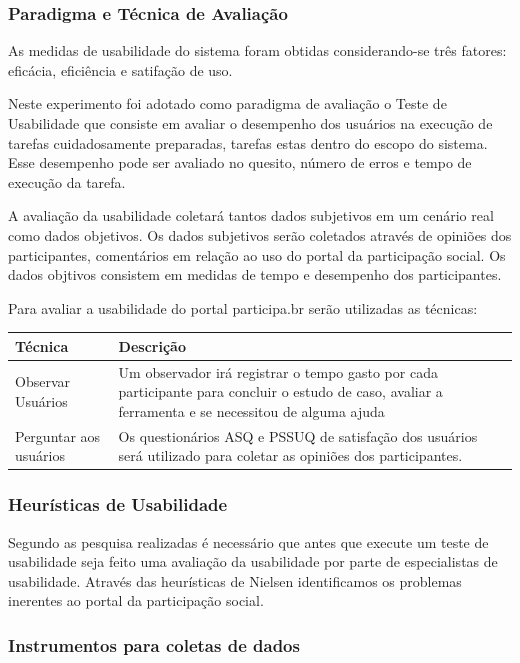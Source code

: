 \subsubsection{Paradigma e Técnica de Avaliação}

As medidas de usabilidade do sistema foram obtidas considerando-se três fatores: eficácia, eficiência e satifação de uso.

Neste experimento foi adotado como paradigma de avaliação o Teste de Usabilidade que consiste em avaliar o desempenho dos usuários na execução de tarefas cuidadosamente preparadas, tarefas estas dentro do escopo do sistema. Esse desempenho pode ser avaliado no quesito, número de erros e tempo de execução da tarefa.

A avaliação da usabilidade coletará tantos dados subjetivos em um cenário real como dados objetivos. Os dados subjetivos serão coletados através de opiniões dos participantes, comentários em relação ao uso do portal da participação social. Os dados objtivos consistem em medidas de tempo e desempenho dos participantes.

Para avaliar a usabilidade do portal participa.br serão utilizadas as técnicas:

\begin{table}[h]
\begin{tabular}{|l| p{10cm} |}
\hline
Técnica & Descrição \\ \hline
Observar Usuários & Um observador irá registrar o tempo 
gasto por cada participante para concluir o estudo de caso, 
avaliar a ferramenta e se necessitou de alguma ajuda    \\ \hline
Perguntar aos usuários & Os questionários ASQ e PSSUQ 
de satisfação dos usuários será utilizado 
para coletar as opiniões dos participantes.\\ \hline
\end{tabular}
\end{table}

\subsubsection{Heurísticas de Usabilidade}

	Segundo as pesquisa realizadas é necessário que antes que execute um teste de usabilidade seja feito uma avaliação da usabilidade por parte de especialistas de usabilidade. Através das heurísticas de Nielsen identificamos os problemas inerentes ao portal da participação social.

\subsubsection{Instrumentos para coletas de dados}

